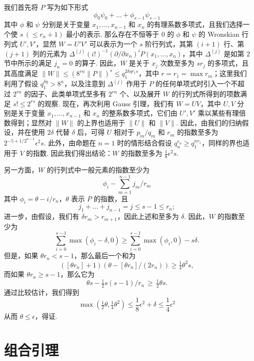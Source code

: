 我们首先将 $P$ 写为如下形式
\[\phi_0 \psi_0 + \dots + \phi_{s-1} \psi_{s-1}\]
其中 $\phi$ 和 $\psi$ 分别是关于变量 $x_1, \dots, x_{n-1}$ 和 $x_n$ 的有理系数多项式，且我们选择一个使 $s \ (\leq r_n + 1)$ 最小的表示. 那么存在不恒等于 0 的 $\phi$ 和 $\psi$ 的 Wronskian 行列式 $U', V'$，显然 $W = U'V'$ 可以表示为一个 $s$ 阶行列式，其第 $(i+1)$ 行、第 $(j+1)$ 列的元素为 $\Delta^{(j)}(i!)^{-1} (\partial/\partial x_n)^i P(x_1, \dots, x_n)$，其中 $\Delta^{(j)}$ 是如第 2 节中所示的满足 $j_n = 0$ 的算子. 因此，$W$ 是关于 $x_j$ 次数至多为 $s r_j$ 的多项式，且其高度满足 $\|W\| \leq (8^{rn} \|P\|)^s \leq q_1^{2\delta\eta r_1 s}$，其中 $r=r_1=\max r_m$；这里我们利用了假设 $q_1^{\delta\eta}>8^n$，以及注意到 $\Delta^{(j)}$ 作用于 $P$ 的任何单项式时引入一个不超过 $2^{rn}$ 的因子、此类单项式至多有 $2^{rn}$ 个、以及展开 $W$ 的行列式所得到的项数满足 $s!\leqslant 2^{rs}$ 的观察. 现在，再次利用 Gauss 引理，我们有 $W=UV$，其中 $U, V$ 分别是关于变量 $x_1,\dots,x_{n-1}$ 和 $x_n$ 的整系数多项式，它们由 $U', V'$ 乘以某些有理倍数得到；显然对 $\|W\|$ 的上界也适用于 $\|U\|$ 和 $\|V\|$. 因此，由我们的归纳假设，并在使用 $2\delta$ 代替 $\delta$ 后，可得 $U$ 相对于 $p_m/q_m$ 和 $r_m$ 的指数至多为 $2^{-5+1/2^{n-1}} \epsilon^2 s$. 此外，由命题在 $n=1$ 时的情形结合假设 $q_n^{r_n}\geqslant q_1^{n r_1}$，同样的界也适用于 $V$ 的指数. 因此我们得出结论：$W$ 的指数至多为 $\frac{1}{8} \epsilon^2 s$.

另一方面，$W$ 的行列式中一般元素的指数至少为
\[\phi_i - \sum_{m=1}^{n-1} j_m / r_m\]
其中 $\phi_i = \theta - i/r_n$，$\theta$ 表示 $P$ 的指数，且
\[j_1+\dots+j_{n-1}=j\leqslant s-1\leqslant r_n;\]
进一步，由假设，我们有 $\delta r_m > r_{m+1}$，因此上述和至多为 $\delta$. 因此，$W$ 的指数至少为
\[\sum_{i=0}^{s-1} \max (\phi_i - \delta, 0) \geqslant \sum_{i=0}^{s-1} \max (\phi_i, 0) - s\delta.\]
但是，如果 $\theta r_n < s-1$，那么最后一个和为
\[([\theta r_n]+1)\left(\theta-[\theta r_n]/(2r_n)\right)\geqslant \tfrac{1}{4}\theta^2 s,\]
而如果 $\theta r_n \geqslant s-1$，那么它为
\[\theta s - \tfrac{1}{2} s(s-1)/r_n \, \geqslant \, \tfrac{1}{2} \theta s.\]
通过比较估计，我们得到
\[\max(\tfrac{1}{2}\theta, \tfrac{1}{4}\theta^2) \leqslant \frac{1}{8}\epsilon^2 + \delta \leqslant \frac{1}{4}\epsilon^2\]
从而 $\theta \leqslant \epsilon$，得证.

\section{组合引理}\label{sec:ch7_4}

